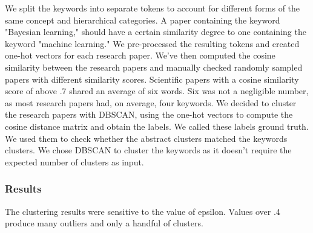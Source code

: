 We split the keywords into separate tokens to account for different forms of the same concept and hierarchical categories. A paper containing the keyword "Bayesian learning," should have a certain similarity degree to one containing the keyword "machine learning." We pre-processed the resulting tokens and created one-hot vectors for each research paper. We've then computed the cosine similarity between the research papers and manually checked randomly sampled papers with different similarity scores. Scientific papers with a cosine similarity score of above .7 shared an average of six words. Six was not a negligible number, as most research papers had, on average, four keywords. We decided to cluster the research papers with DBSCAN, using the one-hot vectors to compute the cosine distance matrix and obtain the labels. We called these labels ground truth. We used them to check whether the abstract clusters matched the keywords clusters. We chose DBSCAN to cluster the keywords as it doesn't require the expected number of clusters as input. 

\subsubsection{Results}
The clustering results were sensitive to the value of epsilon. Values over .4 produce many outliers and only a handful of clusters. 
